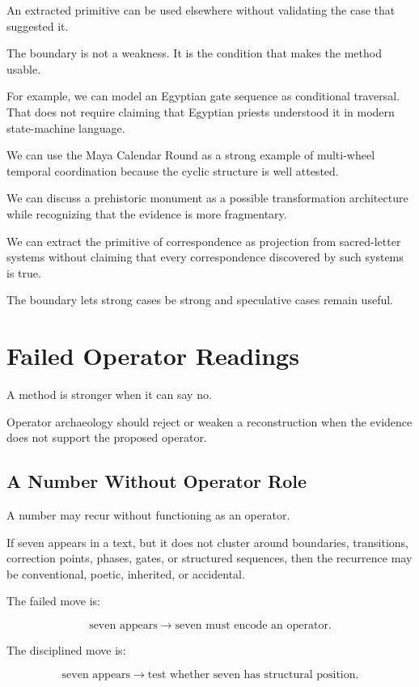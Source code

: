 \documentclass[11pt]{book}
\begin{document}
An extracted primitive can be used elsewhere without validating the case that suggested it.

The boundary is not a weakness. It is the condition that makes the method usable.

For example, we can model an Egyptian gate sequence as conditional traversal. That does not require claiming that Egyptian priests understood it in modern state-machine language.

We can use the Maya Calendar Round as a strong example of multi-wheel temporal coordination because the cyclic structure is well attested.

We can discuss a prehistoric monument as a possible transformation architecture while recognizing that the evidence is more fragmentary.

We can extract the primitive of correspondence as projection from sacred-letter systems without claiming that every correspondence discovered by such systems is true.

The boundary lets strong cases be strong and speculative cases remain useful.

\section{Failed Operator Readings}

A method is stronger when it can say no.

Operator archaeology should reject or weaken a reconstruction when the evidence does not support the proposed operator.

\subsection{A Number Without Operator Role}

A number may recur without functioning as an operator.

If seven appears in a text, but it does not cluster around boundaries, transitions, correction points, phases, gates, or structured sequences, then the recurrence may be conventional, poetic, inherited, or accidental.

The failed move is:

\[
\text{seven appears} \rightarrow \text{seven must encode an operator}.
\]

The disciplined move is:

\[
\text{seven appears} \rightarrow \text{test whether seven has structural position}.
\]
\end{document}
